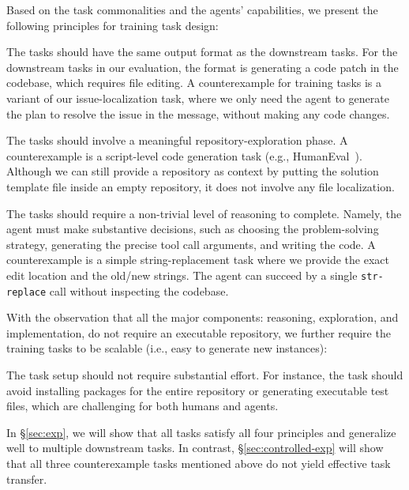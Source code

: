 \documentclass{article}
\theoremstyle{plain}
\theoremstyle{definition}
\theoremstyle{remark}
\begin{document}
Based on the task commonalities and the agents' capabilities, we present the following principles for training task design:

 The tasks should have the same output format as the downstream tasks.
For the downstream tasks in our evaluation, the format is generating a code patch in the codebase, which requires file editing.
A counterexample for training tasks is a variant of our issue-localization task, where we only need the agent to generate the plan to resolve the issue in the message, without making any code changes.

 The tasks should involve a meaningful repository-exploration phase. 
A counterexample is a script-level code generation task (e.g., HumanEval~\cite{codex}). 
Although we can still provide a repository as context by putting the solution template file inside an empty repository, it does not involve any file localization.

 The tasks should require a non-trivial level of reasoning to complete. Namely, the agent must make substantive decisions, such as choosing the problem-solving strategy, generating the precise tool call arguments, and writing the code.
A counterexample is a simple string-replacement task where we provide the exact edit location and the old/new strings. The agent can succeed by a single \texttt{str-replace} call without inspecting the codebase.


With the observation that all the major components: reasoning, exploration, and implementation, do not require an executable repository, we further require the training tasks to be scalable (i.e., easy to generate new instances):

 The task setup should not require substantial effort. For instance, the task should avoid installing packages for the entire repository or generating executable test files, which are challenging for both humans and agents.

In \S\ref{sec:exp}, we will show that all \methodName tasks satisfy all four principles and generalize well to multiple downstream tasks.
In contrast, \S\ref{sec:controlled-exp} will show that all three counterexample tasks mentioned above do not yield effective task transfer.
\end{document}
